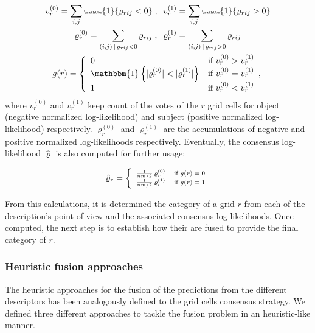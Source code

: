 \documentclass[10pt,twocolumn,letterpaper]{article}
\begin{document}
\begin{gather*}\tiny
v_r^{(0)} = \sum_{i,j} \mathbbm{1}\{\varrho_{rij} < 0\} \;,\;\; v_r^{(1)} = \sum_{i,j} \mathbbm{1}\{\varrho_{rij} > 0\}  \\
\varrho_{r}^{(0)} = \sum_{(i,j) \,|\, \varrho_{rij} < 0} \varrho_{rij} \;,\;\; \varrho_{r}^{(1)} = \sum_{(i,j) \,|\, \varrho_{rij} > 0} \varrho_{rij} \\
g(r) =
\left\{
	\begin{array}{ll}
		0  & \mbox{if }  v_r^{(0)} > v_r^{(1)} \\
		\mathbbm{1}\left\{ |\varrho_{r}^{(0)}| < |\varrho_{r}^{(1)}| \right\} &  \mbox{if } v_r^{(0)} = v_r^{(1)} \\
		1 & \mbox{if }  v_r^{(0)} < v_r^{(1)} \\
	\end{array},
\right.
\end{gather*}
where $v_r^{(0)}$ and $v_r^{(1)}$ keep count of the votes of the $r$ grid cells for object (negative normalized log-likelihood) and subject (positive normalized log-likelihood) respectively. $\varrho_r^{(0)}$ and $\varrho_r^{(1)}$ are the accumulations of negative and positive normalized log-likelihoods respectively. Eventually, the consensus log-likelihood $\hat{\varrho}$ is also computed for further usage:

\begin{gather*}\scriptsize
\hat{\varrho}_r =
\left\{
	\begin{array}{ll}
		\frac{1}{nm / 2} \, \varrho_{r}^{(0)}  & \mbox{if }  g(r) = 0  \\
		\frac{1}{nm / 2} \, \varrho_{r}^{(1)} & \mbox{if }  g(r) = 1
	\end{array}
\right.
\end{gather*}

From this calculations, it is determined the category of a grid $r$ from each of the description's point of view and the associated consensus log-likelihoods. Once computed, the next step is to establish how their are fused to provide the final category of $r$.

\subsubsection{Heuristic fusion approaches}

The heuristic approaches for the fusion of the predictions from the different descriptors has been analogously defined to the grid cells consensus strategy. We defined three different approaches to tackle the fusion problem in an heuristic-like manner.
\end{document}
